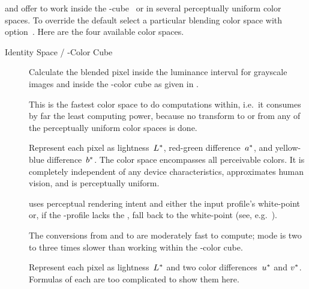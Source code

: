  and  offer to work inside the
-cube~ or in several perceptually uniform color spaces.  To
override the default select a particular blending color space with
option~.  Here are the four
available color spaces.

\begin{description}
\item[Identity Space / -Color Cube]\itemend
  Calculate the blended pixel inside the luminance interval 
  for grayscale images and inside the -color cube as given in
  .

  This is the fastest color space to do computations within, i.e.\ it consumes by far the least
  computing power, because no transform to or from any of the perceptually uniform color spaces
  is done.

\item[]\itemend\urltext

  Represent each pixel as lightness~$L\mbox{${}^{*}$}$, red-green difference~$a\mbox{${}^{*}$}$,
  and yellow-blue difference~$b\mbox{${}^{*}$}$.  The
   color space encompasses all perceivable colors.  It is
  completely independent of any device characteristics, approximates human vision, and is
  perceptually uniform.

  \App{} uses perceptual rendering intent and either the input profile's white-point or, if the
  -profile lacks the , fall back to the
   white-point (see,
  e.g.\ ).

  The conversions from and to  are moderately fast to compute; 
  mode is two to three times slower than working within the -color cube.

\item[]\itemend\urltext
  Represent each pixel as lightness~$L\mbox{${}^{*}$}$ and two color
  differences~$u\mbox{${}^{*}$}$ and $v\mbox{${}^{*}$}$.  Formulas of each are too complicated
  to show them here.


\end{description}
